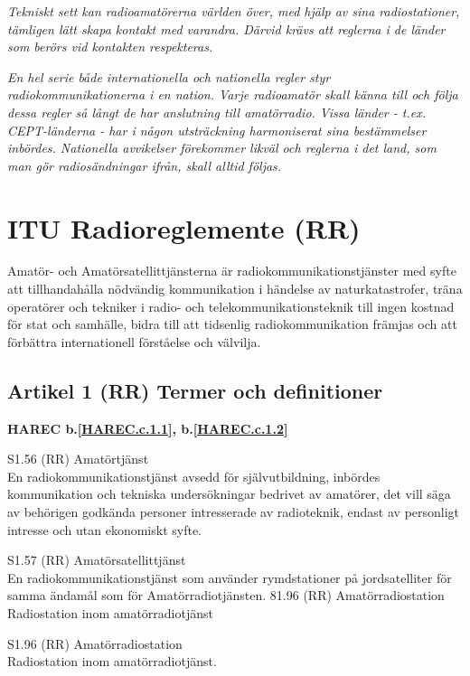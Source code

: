 \emph{Tekniskt sett kan radioamatörerna världen över, med hjälp av
  sina radiostationer, tämligen lätt skapa kontakt med
  varandra. Därvid krävs att reglerna i de länder som berörs vid
  kontakten respekteras.}

\emph{En hel serie både internationella och nationella regler styr
  radiokommunikationerna i en nation. Varje radioamatör skall känna
  till och följa dessa regler så långt de har anslutning till
  amatörradio. Vissa länder - t.ex. CEPT-länderna - har i någon
  utsträckning harmoniserat sina bestämmelser inbördes.  Nationella
  avvikelser förekommer likväl och reglerna i det land, som man gör
  radiosändningar ifrån, skall alltid följas.}

\section{ITU Radioreglemente (RR)}

Amatör- och Amatörsatellittjänsterna är radiokommunikationstjänster
med syfte att tillhandahålla nödvändig kommunikation i händelse av
naturkatastrofer, träna operatörer och tekniker i radio- och
telekommunikationsteknik till ingen kostnad för stat och samhälle,
bidra till att tidsenlig radiokommunikation främjas och att förbättra
internationell förståelse och välvilja.


\subsection{Artikel 1 (RR) Termer och definitioner}
\textbf{
HAREC b.\ref{HAREC.c.1.1}\label{myHAREC.c.1.1},
 b.\ref{HAREC.c.1.2}\label{myHAREC.c.1.2}
}

S1.56 (RR) Amatörtjänst \\
En radiokommunikationstjänst avsedd för självutbildning, inbördes
kommunikation och tekniska undersökningar bedrivet av amatörer, det
vill säga av behörigen godkända personer intresserade av radioteknik,
endast av personligt intresse och utan ekonomiskt syfte.

S1.57 (RR) Amatörsatellittjänst \\
En radiokommunikationstjänst som använder rymdstationer på
jordsatelliter för samma ändamål som för Amatörradiotjänsten.  81.96
(RR) Amatörradiostation Radiostation inom amatörradiotjänst

S1.96 (RR) Amatörradiostation \\
Radiostation inom amatörradiotjänst.

